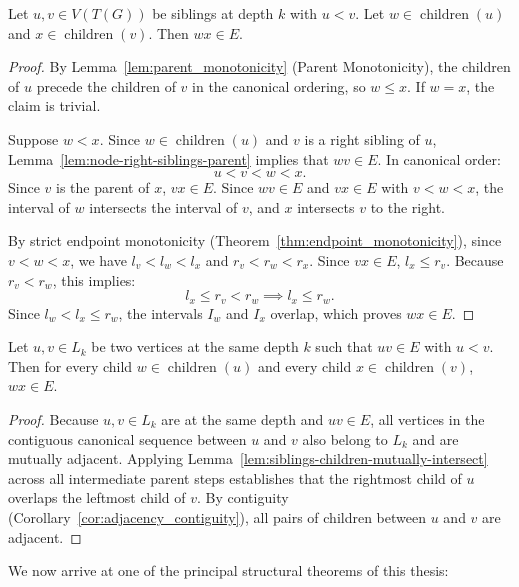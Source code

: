 \begin{lemma}
\label{lem:siblings-children-mutually-intersect}
Let $u, v \in V(T(G))$ be siblings at depth $k$ with $u < v$. Let $w \in \operatorname{children}(u)$ and $x \in \operatorname{children}(v)$. Then $wx \in E$.
\end{lemma}
\begin{proof}
By Lemma~\ref{lem:parent_monotonicity} (Parent Monotonicity), the children of $u$ precede the children of $v$ in the canonical ordering, so $w \le x$. If $w = x$, the claim is trivial. 

Suppose $w < x$. Since $w \in \operatorname{children}(u)$ and $v$ is a right sibling of $u$, Lemma~\ref{lem:node-right-siblings-parent} implies that $wv \in E$. In canonical order:
\[
    u < v < w < x.
\]
Since $v$ is the parent of $x$, $vx \in E$. Since $wv \in E$ and $vx \in E$ with $v < w < x$, the interval of $w$ intersects the interval of $v$, and $x$ intersects $v$ to the right. 

By strict endpoint monotonicity (Theorem~\ref{thm:endpoint_monotonicity}), since $v < w < x$, we have $l_v < l_w < l_x$ and $r_v < r_w < r_x$. Since $vx \in E$, $l_x \le r_v$. Because $r_v < r_w$, this implies:
\[
    l_x \le r_v < r_w \implies l_x \le r_w.
\]
Since $l_w < l_x \le r_w$, the intervals $I_w$ and $I_x$ overlap, which proves $wx \in E$.
\end{proof}

\begin{lemma}
\label{lem:children-adjacency-propagation}
Let $u, v \in L_k$ be two vertices at the same depth $k$ such that $uv \in E$ with $u < v$. Then for every child $w \in \operatorname{children}(u)$ and every child $x \in \operatorname{children}(v)$, $wx \in E$.
\end{lemma}
\begin{proof}
Because $u, v \in L_k$ are at the same depth and $uv \in E$, all vertices in the contiguous canonical sequence between $u$ and $v$ also belong to $L_k$ and are mutually adjacent. Applying Lemma~\ref{lem:siblings-children-mutually-intersect} across all intermediate parent steps establishes that the rightmost child of $u$ overlaps the leftmost child of $v$. By contiguity (Corollary~\ref{cor:adjacency_contiguity}), all pairs of children between $u$ and $v$ are adjacent.
\end{proof}

We now arrive at one of the principal structural theorems of this thesis:

